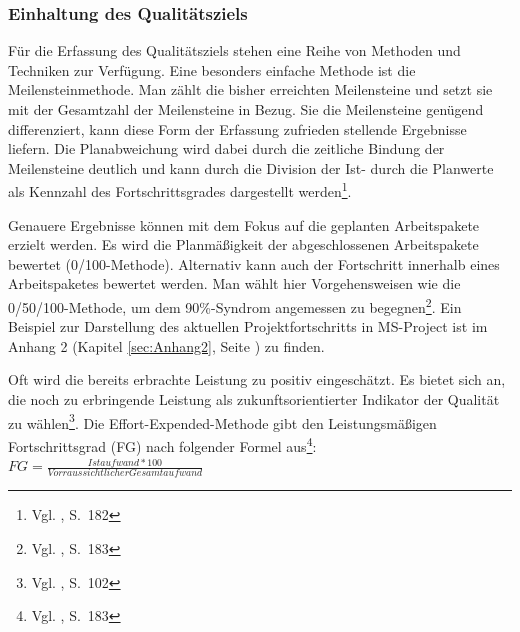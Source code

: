 \subsubsection{Einhaltung des Qualitätsziels}
Für die Erfassung des Qualitätsziels stehen eine Reihe von Methoden und Techniken zur Verfügung. Eine besonders einfache Methode ist die Meilensteinmethode. Man zählt die bisher erreichten Meilensteine und setzt sie mit der Gesamtzahl der Meilensteine in Bezug. Sie die Meilensteine genügend differenziert, kann diese Form der Erfassung zufrieden stellende Ergebnisse liefern. Die Planabweichung wird dabei durch die zeitliche Bindung der Meilensteine deutlich und kann durch die Division der Ist- durch die Planwerte als Kennzahl des Fortschrittsgrades dargestellt werden\footnote{Vgl. \cite{Fiedler2008}, S.~182}.

Genauere Ergebnisse können mit dem Fokus auf die geplanten Arbeitspakete erzielt werden. Es wird die Planmäßigkeit der abgeschlossenen Arbeitspakete bewertet (0/100-Methode). Alternativ kann auch der Fortschritt innerhalb eines Arbeitspaketes bewertet werden. Man wählt hier Vorgehensweisen wie die 0/50/100-Methode, um dem 90\%-Syndrom angemessen zu begegnen\footnote{Vgl. \cite{Fiedler2008}, S.~183}.
Ein Beispiel zur Darstellung des aktuellen Projektfortschritts in MS-Project ist im Anhang 2 (Kapitel \ref{sec:Anhang2}, Seite \pageref{sec:Anhang2}) zu finden.

Oft wird die bereits erbrachte Leistung zu positiv eingeschätzt. Es bietet sich an, die noch zu erbringende Leistung als zukunftsorientierter Indikator der Qualität zu wählen\footnote{Vgl. \cite{Luschow&Zitzke2004}, S.~102}. Die Effort-Expended-Methode gibt den Leistungsmäßigen Fortschrittsgrad (FG) nach folgender Formel aus\footnote{Vgl. \cite{Fiedler2008}, S.~183}: $FG = \frac{Istaufwand*100}{Vorraussichtlicher Gesamtaufwand}$

